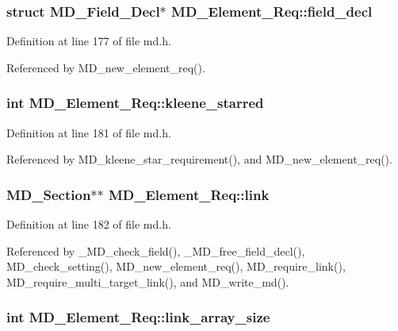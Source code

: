 \subsubsection{\setlength{\rightskip}{0pt plus 5cm}struct \bf{MD\_\-Field\_\-Decl}$\ast$ \bf{MD\_\-Element\_\-Req::field\_\-decl}}\label{structMD__Element__Req_a7fb141566ea81843d8f02c8c964fc93}




Definition at line 177 of file md.h.

Referenced by MD\_\-new\_\-element\_\-req().
\subsubsection{\setlength{\rightskip}{0pt plus 5cm}int \bf{MD\_\-Element\_\-Req::kleene\_\-starred}}\label{structMD__Element__Req_5f881765580aa53a9209df89120e46d7}




Definition at line 181 of file md.h.

Referenced by MD\_\-kleene\_\-star\_\-requirement(), and MD\_\-new\_\-element\_\-req().
\subsubsection{\setlength{\rightskip}{0pt plus 5cm}\bf{MD\_\-Section}$\ast$$\ast$ \bf{MD\_\-Element\_\-Req::link}}\label{structMD__Element__Req_1a814cd454fa772891c5fff8d77a14c3}




Definition at line 182 of file md.h.

Referenced by \_\-MD\_\-check\_\-field(), \_\-MD\_\-free\_\-field\_\-decl(), MD\_\-check\_\-setting(), MD\_\-new\_\-element\_\-req(), MD\_\-require\_\-link(), MD\_\-require\_\-multi\_\-target\_\-link(), and MD\_\-write\_\-md().
\subsubsection{\setlength{\rightskip}{0pt plus 5cm}int \bf{MD\_\-Element\_\-Req::link\_\-array\_\-size}}\label{structMD__Element__Req_2abe43cebd3f2835f64c06a9986b5eb8}




